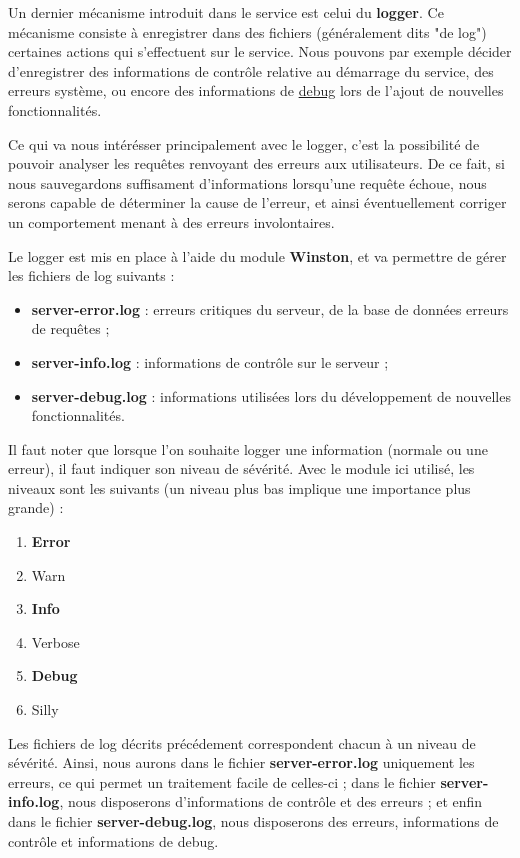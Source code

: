 Un dernier mécanisme introduit dans le service est celui du \textbf{logger}. Ce mécanisme consiste à enregistrer dans des fichiers (généralement dits "de log") certaines actions qui s'effectuent sur le service. Nous pouvons par exemple décider d'enregistrer des informations de contrôle relative au démarrage du service, des erreurs système, ou encore des informations de \underline{debug} lors de l'ajout de nouvelles fonctionnalités.

Ce qui va nous intérésser principalement avec le logger, c'est la possibilité de pouvoir analyser les requêtes renvoyant des erreurs aux utilisateurs.
De ce fait, si nous sauvegardons suffisament d'informations lorsqu'une requête échoue, nous serons capable de déterminer la cause de l'erreur, et ainsi éventuellement corriger un comportement menant à des erreurs involontaires.

Le logger est mis en place à l'aide du module \textbf{Winston}, et va permettre de gérer les fichiers de log suivants :
\begin{itemize}
    \item \textbf{server-error.log} : erreurs critiques du serveur, de la base de données erreurs de requêtes ;
    \item \textbf{server-info.log} : informations de contrôle sur le serveur ;
    \item \textbf{server-debug.log} : informations utilisées lors du développement de nouvelles fonctionnalités.
\end{itemize}

Il faut noter que lorsque l'on souhaite logger une information (normale ou une erreur), il faut indiquer son niveau de sévérité. Avec le module ici utilisé, les niveaux sont les suivants (un niveau plus bas implique une importance plus grande) :
\begin{enumerate}
    \item \textbf{Error}
    \item Warn
    \item \textbf{Info}
    \item Verbose
    \item \textbf{Debug}
    \item Silly
\end{enumerate}

Les fichiers de log décrits précédement correspondent chacun à un niveau de sévérité. Ainsi, nous aurons dans le fichier \textbf{server-error.log} uniquement les erreurs, ce qui permet un traitement facile de celles-ci ; dans le fichier \textbf{server-info.log}, nous disposerons d'informations de contrôle et des erreurs ; et enfin dans le fichier \textbf{server-debug.log}, nous disposerons des erreurs, informations de contrôle et informations de debug.

